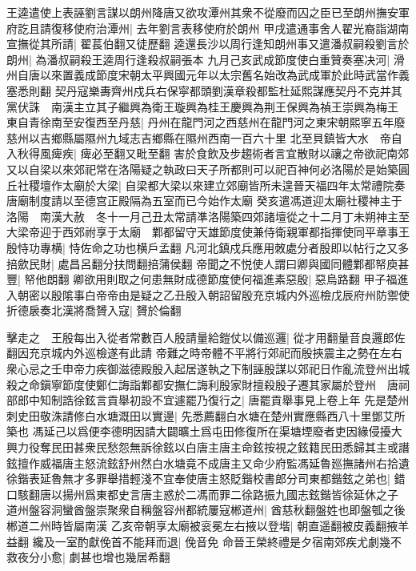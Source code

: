王逵遣使上表誣劉言謀以朗州降唐又欲攻潭州其衆不從廢而囚之臣已至朗州撫安軍府訖且請復移使府治潭州|{
	去年劉言表移使府於朗州}
甲戌遣通事舍人翟光裔詣湖南宣撫從其所請|{
	翟萇伯翻又徒歷翻}
逵還長沙以周行逢知朗州事又遣潘叔嗣殺劉言於朗州|{
	為潘叔嗣殺王逵周行逢殺叔嗣張本}
九月己亥武成節度使白重贊奏塞决河|{
	滑州自唐以來置義成節度宋朝太平興國元年以太宗舊名始改為武成軍於此時武當作義塞悉則翻}
契丹寇樂夀齊州戍兵右保寜都頭劉漢章殺都監杜延熙謀應契丹不克并其黨伏誅　南漢主立其子繼興為衛王璇興為桂王慶興為荆王保興為禎王崇興為梅王　東自青徐南至安復西至丹慈|{
	丹州在龍門河之西慈州在龍門河之東宋朝熙寧五年廢慈州以吉鄉縣屬隰州九域志吉鄉縣在隰州西南一百六十里}
北至貝鎮皆大水　帝自入秋得風痺疾|{
	痺必至翻又毗至翻}
害於食飲及步趨術者言宜散財以禳之帝欲祀南郊又以自梁以來郊祀常在洛陽疑之執政曰天子所都則可以祀百神何必洛陽於是始築圓丘社稷壇作太廟於大梁|{
	自梁都大梁以來建立郊廟皆所未遑晉天福四年太常禮院奏唐廟制度請以至德宫正殿隔為五室而已今始作太廟}
癸亥遣馮道迎太廟社稷神主于洛陽　南漢大赦　冬十一月己丑太常請凖洛陽築四郊諸壇從之十二月丁未朔神主至大梁帝迎于西郊祔享于太廟　鄴都留守天雄節度使兼侍衛親軍都指揮使同平章事王殷恃功專横|{
	恃佐命之功也横戶孟翻}
凡河北鎮戍兵應用敇處分者殷即以帖行之又多掊歛民財|{
	處昌呂翻分扶問翻掊蒲侯翻}
帝聞之不悦使人謂曰卿與國同體鄴都帑庾甚豐|{
	帑他朗翻}
卿欲用則取之何患無財成德節度使何福進素惡殷|{
	惡烏路翻}
甲子福進入朝密以殷隂事白帝帝由是疑之乙丑殷入朝詔留殷充京城内外巡檢戊辰府州防禦使折德扆奏北漢將喬贇入寇|{
	贇於倫翻}


擊走之　王殷每出入從者常數百人殷請量給鎧仗以備巡邏|{
	從才用翻量音良邏郎佐翻因充京城内外巡檢遂有此請}
帝難之時帝體不平將行郊祀而殷挾震主之勢在左右衆心忌之壬申帝力疾御滋德殿殷入起居遂執之下制誣殷謀以郊祀日作亂流登州出城殺之命鎭寧節度使鄭仁誨詣鄴都安撫仁誨利殷家財擅殺殷子遷其家屬於登州　唐祠部郎中知制誥徐鉉言貢舉初設不宜遽罷乃復行之|{
	唐罷貢舉事見上卷上年}
先是楚州刺史田敬洙請修白水塘溉田以實邊|{
	先悉薦翻白水塘在楚州實應縣西八十里鄧艾所築也}
馮延己以爲便李德明因請大闢曠土爲屯田修復所在渠塘堙廢者吏因緣侵擾大興力役奪民田甚衆民愁怨無訴徐鉉以白唐主唐主命鉉按視之鉉籍民田悉歸其主或譖鉉擅作威福唐主怒流鉉舒州然白水塘竟不成唐主又命少府監馮延魯廵撫諸州右拾遺徐鍇表延魯無才多罪舉措輕淺不宜奉使唐主怒貶鍇校書郎分司東都鍇鉉之弟也|{
	錯口駭翻唐以揚州爲東都史言唐主惑於二馮而罪二徐路振九國志鉉鍇皆徐延休之子}
道州盤容洞蠻酋盤崇聚衆自稱盤容州都統屢寇郴道州|{
	酋慈秋翻盤姓也即盤瓠之後郴道二州時皆屬南漢}
乙亥帝朝享太廟被衮冕左右掖以登堦|{
	朝直遥翻被皮義翻掖羊益翻}
纔及一室酌獻俛首不能拜而退|{
	俛音免}
命晉王榮終禮是夕宿南郊疾尤劇幾不救夜分小愈|{
	劇甚也增也幾居希翻}


